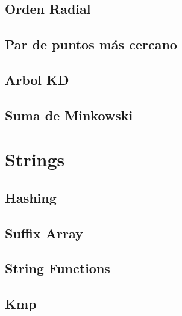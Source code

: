 \documentclass[a4paper,11pt,landscape,twocolumn]{article}
\begin{document}


\subsection{Orden Radial}



\subsection{Par de puntos más cercano}



\subsection{Arbol KD}



\subsection{Suma de Minkowski}



\section{Strings}

\subsection{Hashing}



\subsection{Suffix Array}



\subsection{String Functions}



\subsection{Kmp}
\end{document}
